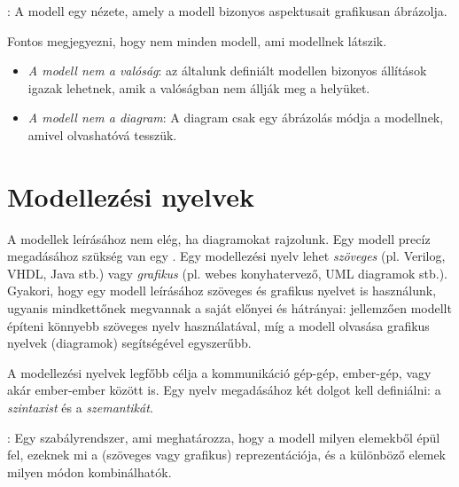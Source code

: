 \begin{definicio}
	: A modell egy nézete, amely a modell bizonyos aspektusait grafikusan ábrázolja.
\end{definicio}

\begin{megjegyzes}
Fontos megjegyezni, hogy nem minden modell, ami modellnek látszik.

\begin{itemize}
	\item \emph{A modell nem a valóság}: az általunk definiált modellen bizonyos állítások igazak lehetnek, amik a valóságban nem állják meg a helyüket.
	\item \emph{A modell nem a diagram}: A diagram csak egy ábrázolás módja a modellnek, amivel olvashatóvá tesszük. 
\end{itemize}
\end{megjegyzes}


\section{Modellezési nyelvek}

A modellek leírásához nem elég, ha diagramokat rajzolunk. Egy modell precíz megadásához szükség van egy . Egy modellezési nyelv lehet \emph{szöveges} (pl. Verilog, VHDL, Java stb.) vagy \emph{grafikus} (pl. webes konyhatervező, UML diagramok stb.). Gyakori, hogy egy modell leírásához szöveges és grafikus nyelvet is használunk, ugyanis mindkettőnek megvannak a saját előnyei és hátrányai: jellemzően modellt építeni könnyebb szöveges nyelv használatával, míg a modell olvasása grafikus nyelvek (diagramok) segítségével egyszerűbb.

A modellezési nyelvek legfőbb célja a kommunikáció gép-gép, ember-gép, vagy akár ember-ember között is. Egy nyelv megadásához két dolgot kell definiálni: a \emph{szintaxist} és a \emph{szemantikát}.


\begin{definicio}
	: Egy szabályrendszer, ami meghatározza, hogy a modell milyen elemekből épül fel, ezeknek mi a (szöveges vagy grafikus) reprezentációja, és a különböző elemek milyen módon kombinálhatók.
\end{definicio}

